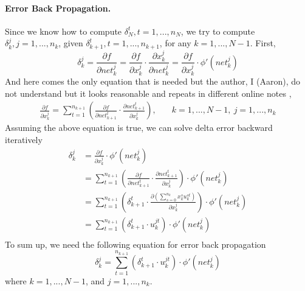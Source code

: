 \paragraph{Error Back Propagation.}
Since we know how to compute $\delta_N^t, t = 1,...,n_N$, we try to compute $\delta_{k}^j, j = 1,...,n_{k}$, given $\delta_{k+1}^t, t = 1,...,n_{k+1}$, for any $k = 1,...,N-1$.
First,
\[
    \delta_{k}^j
    = \frac{\partial f}{\partial \mathit{net}_{k}^j}
    = \frac{\partial f}{\partial x_{k}^j} \cdot \frac{\partial x_{k}^j}{\partial \mathit{net}_{k}^j}
    = \frac{\partial f}{\partial x_{k}^j} \cdot \phi'(\mathit{net}_{k}^j)
\]
And here comes the only equation that is needed but the author, I (Aaron), do not understand but it looks reasonable and repeats in different online notes \cite{mlp_gradient_wisc},
\[\begin{alignedat}{5}
    \frac{\partial f}{\partial x_{k}^j} = \sum_{t=1}^{n_{k+1}} \left( \frac{\partial f}{\partial \mathit{net}_{k+1}^t} \cdot \frac{\partial \mathit{net}_{k+1}^t}{\partial x_{k}^j} \right),
    &\quad k = 1,...,N-1, \: j = 1,...,n_{k}
\end{alignedat}\]
Assuming the above equation is true, we can solve delta error backward iteratively
\[\begin{aligned}
    \delta_{k}^j
    &= \frac{\partial f}{\partial x_{k}^j} \cdot \phi'(\mathit{net}_{k}^j) \\
    &= \sum_{t=1}^{n_{k+1}} \left( \frac{\partial f}{\partial \mathit{net}_{k+1}^t} \cdot \frac{\partial \mathit{net}_{k+1}^t}{\partial x_{k}^j} \right) \cdot \phi'(\mathit{net}_{k}^j) \\
    &= \sum_{t=1}^{n_{k+1}} \left( \delta_{k+1}^t \cdot \frac{\partial \left( \sum_{s=0}^{n_{k}} x_{k}^s u_{k}^{st} \right) }{\partial x_{k}^j} \right) \cdot \phi'(\mathit{net}_{k}^j) \\
    &= \sum_{t=1}^{n_{k+1}} \left( \delta_{k+1}^t \cdot u_{k}^{jt} \right) \cdot \phi'(\mathit{net}_{k}^j) \\
\end{aligned}\]
To sum up, we need the following equation for error back propagation
\[\boxed{\delta_{k}^j = \sum_{t=1}^{n_{k+1}} \left( \delta_{k+1}^t \cdot u_{k}^{jt} \right) \cdot \phi'(\mathit{net}_{k}^j)}\]
where $k = 1,...,N-1$, and $j = 1,...,n_{k}$.

